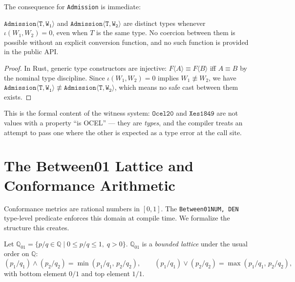 The consequence for \texttt{Admission} is immediate:

\begin{proposition}
$\mathtt{Admission\langle T, W_1\rangle}$ and
$\mathtt{Admission\langle T, W_2\rangle}$ are distinct types whenever
$\iota(W_1, W_2) = 0$, even when $T$ is the same type. No coercion between
them is possible without an explicit conversion function, and no such function
is provided in the public API.
\end{proposition}

\begin{proof}
In Rust, generic type constructors are injective: $F\langle A\rangle \equiv
F\langle B\rangle$ iff $A \equiv B$ by the nominal type discipline. Since
$\iota(W_1, W_2) = 0$ implies $W_1 \not\equiv W_2$, we have
$\mathtt{Admission\langle T, W_1\rangle} \not\equiv
\mathtt{Admission\langle T, W_2\rangle}$, which means no safe cast between
them exists.
\end{proof}

This is the formal content of the witness system: $\mathtt{Ocel20}$ and
$\mathtt{Xes1849}$ are not values with a property ``is OCEL'' --- they are
\emph{types}, and the compiler treats an attempt to pass one where the other
is expected as a type error at the call site.

\section{The Between01 Lattice and Conformance Arithmetic}
\label{sec:conc-lattice}

Conformance metrics are rational numbers in $[0,1]$. The
\texttt{Between01\langle NUM, DEN\rangle} type-level predicate enforces this
domain at compile time. We formalize the structure this creates.

\begin{definition}
Let $\mathbb{Q}_{01} = \{p/q \in \mathbb{Q} \mid 0 \leq p/q \leq 1,\; q > 0\}$.
$\mathbb{Q}_{01}$ is a \emph{bounded lattice} under the usual order on
$\mathbb{Q}$:
\[
  (p_1/q_1) \wedge (p_2/q_2) = \min(p_1/q_1,\, p_2/q_2), \qquad
  (p_1/q_1) \vee (p_2/q_2) = \max(p_1/q_1,\, p_2/q_2),
\]
with bottom element $0/1$ and top element $1/1$.
\end{definition}

